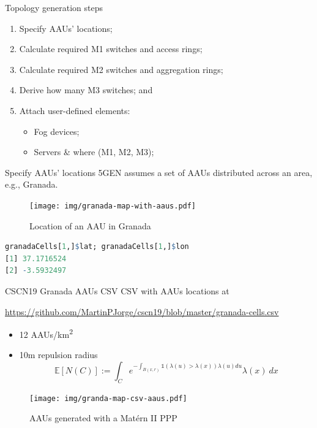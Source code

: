 \documentclass{beamer}
\begin{document}
\begin{frame}{Topology generation steps}
    \begin{enumerate}
        \item Specify AAUs' locations;
        \item Calculate required M1 switches and access rings;
        \item Calculate required M2 switches and aggregation rings;
        \item Derive how many M3 switches; and
        \item Attach user-defined elements:
            \begin{itemize}
                \item Fog devices;
                \item Servers \& where (M1, M2, M3);
            \end{itemize}
    \end{enumerate}
\end{frame}


\begin{frame}[fragile]{Specify AAUs' locations}
    5GEN assumes a set of AAUs distributed across an area, e.g., Granada.

    \begin{figure}
        \texttt{[image: img/granada-map-with-aaus.pdf]}
        \caption{Location of an AAU in Granada}
    \end{figure}


    \begin{lstlisting}[language=R]
granadaCells[1,]$lat; granadaCells[1,]$lon
[1] 37.1716524
[2] -3.5932497\end{lstlisting}
\end{frame}



\begin{frame}{CSCN19 Granada AAUs CSV}
    CSV with AAUs locations at

    \url{https://github.com/MartinPJorge/cscn19/blob/master/granada-cells.csv}
    \begin{itemize}
        \item 12 AAUs/km\textsuperscript{2}
        \item 10m repulsion radius
        \begin{equation}
            \mathbb{E}\left[ N(C) \right] := \int_C e^{-\int_{B(x,r)} \mathds{1}\left(\lambda(u) > \lambda(x) \right) \lambda(u) du} \lambda(x)\ dx
            \label{eq:inh-matern2-avg}
        \end{equation}
    \end{itemize}

    \begin{figure}
        \texttt{[image: img/granda-map-csv-aaus.pdf]}
        \caption{AAUs generated with a Matérn II PPP \cite{repulsion}}
    \end{figure}
\end{frame}
\end{document}

